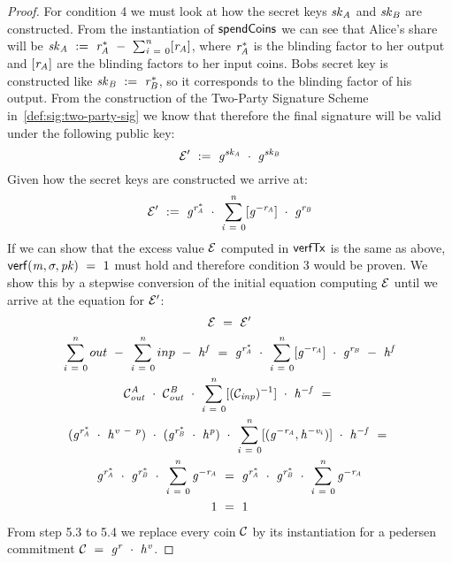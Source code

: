 \begin{proof}
    For condition 4 we must look at how the secret keys $\mathit{sk}_{\mathit{A}}$ and $\mathit{sk}_{\mathit{B}}$ are constructed.
    From the instantiation of $\mathsf{spendCoins}$ we can see that Alice's share will be $\mathit{sk}_{\mathit{A}} ~:=~ \mathit{r}_{\mathit{A}}^* ~-~ \sum_{\mathit{i} ~=~ 0}^{\mathit{n}} [\mathit{r}_{\mathit{A}}]$, where $\mathit{r}_{\mathit{A}}^*$ is the blinding factor to her output and $[\mathit{r}_{\mathit{A}}]$ are the blinding factors to her input coins.
    Bobs secret key is constructed like $\mathit{sk}_{\mathit{B}} ~:=~ \mathit{r}_{\mathit{B}}^*$, so it corresponds to the blinding factor of his output.
    From the construction of the Two-Party Signature Scheme in~\cref{def:sig:two-party-sig} we know that therefore the final signature will be valid under the following public key:
    \[ {\mathcal{E}}' ~:=~ \mathit{g}^{\mathit{sk}_{\mathit{A}}} ~\cdot~ \mathit{g}^{\mathit{sk}_{\mathit{B}}} \]
    Given how the secret keys are constructed we arrive at:
    \[ {\mathcal{E}}' ~:=~ \mathit{g}^{\mathit{r}_{\mathit{A}}^*} ~\cdot~ \sum_{\mathit{i} ~=~ 0}^{\mathit{n}} [\mathit{g}^{- \mathit{r}_{\mathit{A}}}] ~\cdot~ \mathit{g}^{\mathit{r}_{\mathit{B}}} \]
    If we can show that the excess value $\mathcal{E}$ computed in $\mathsf{verfTx}$ is the same as above, $\mathsf{verf}(\mathit{m}, \sigma, \mathit{pk}) ~=~ 1$ must hold and therefore condition 3 would be proven.
    We show this by a stepwise conversion of the initial equation computing $\mathcal{E}$ until we arrive at the equation for ${\mathcal{E}}'$:
    \begin{gather}
        \mathcal{E} ~=~ {\mathcal{E}}' \\
        \sum_{\mathit{i} ~=~ 0}^{\mathit{n}} out ~-~ \sum_{\mathit{i} ~=~ 0}^{\mathit{n}} inp ~-~ \mathit{h}^{\mathit{f}}  ~=~ \mathit{g}^{\mathit{r}_{\mathit{A}}^*} ~\cdot~ \sum_{\mathit{i} ~=~ 0}^{\mathit{n}} [\mathit{g}^{- \mathit{r}_{\mathit{A}}}] ~\cdot~ \mathit{g}^{\mathit{r}_{\mathit{B}}} ~-~ \mathit{h}^{\mathit{f}} \\
        \mathcal{C}_{\mathit{out}}^{\mathit{A}} ~\cdot~ \mathcal{C}_{\mathit{out}}^{\mathit{B}} ~\cdot~ \sum_{\mathit{i} ~=~ 0}^{\mathit{n}} [(\mathcal{C}_{\mathit{inp}})^{-1}] ~\cdot~ \mathit{h}^{- \mathit{f}}  ~=~\\
        (\mathit{g}^{\mathit{r}_{\mathit{A}}^*} ~\cdot~ \mathit{h}^{\mathit{v} ~-~ \mathit{p}}) ~\cdot~
        (\mathit{g}^{\mathit{r}_{\mathit{B}}^*} ~\cdot~ \mathit{h}^{\mathit{p}}) ~\cdot~
        \sum_{\mathit{i} ~=~ 0}^{\mathit{n}} [(\mathit{g}^{- \mathit{r}_{\mathit{A}}}, \mathit{h}^{- \mathit{v}_i})] ~\cdot~ \mathit{h}^{- \mathit{f}} ~=~ \\
        \mathit{g}^{\mathit{r}_{\mathit{A}}^*} ~\cdot~ \mathit{g}^{\mathit{r}_{\mathit{B}}^*} ~\cdot~ \sum_{\mathit{i} ~=~ 0}^{\mathit{n}} \mathit{g}^{- \mathit{r}_{\mathit{A}}} ~=~ \mathit{g}^{\mathit{r}_{\mathit{A}}^*} ~\cdot~ \mathit{g}^{\mathit{r}_{\mathit{B}}^*} ~\cdot~ \sum_{\mathit{i} ~=~ 0}^{\mathit{n}} \mathit{g}^{- \mathit{r}_{\mathit{A}}} \\
        1 ~=~ 1
    \end{gather}
    From step 5.3 to 5.4 we replace every coin $\mathcal{C}$ by its instantiation for a pedersen commitment $\mathcal{C} ~=~ \mathit{g}^{\mathit{r}} ~\cdot~ \mathit{h}^{\mathit{v}}$.


\end{proof}
